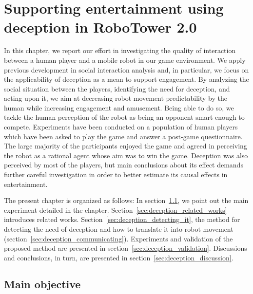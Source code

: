 \chapter{Supporting entertainment using deception in RoboTower 2.0}\label{ch:deception}

In this chapter, we report our effort in investigating the quality of interaction between a human player and a mobile robot in our game environment. %
We apply previous development in social interaction analysis and, in particular, we focus on the applicability of deception as a mean to support engagement. By analyzing the social situation between the players, identifying the need for deception, and acting upon it, we aim at decreasing robot movement predictability by the human while increasing engagement and amusement. Being able to do so, we tackle the human perception of the robot as being an opponent smart enough to compete. Experiments have been conducted on a population of human players which have been asked to play the game and answer a post-game questionnaire. The large majority of the participants enjoyed the game and agreed in perceiving the robot as a rational agent whose aim was to win the game. Deception was also perceived by most of the players, but main conclusions about its effect demands further careful investigation in order to better estimate its causal effects in entertainment.

The present chapter is organized as follows: In section~\ref{sec:deception_main_objectives}, we point out the main experiment detailed in the chapter. Section~\ref{sec:deception_related_works} introduces related works. Section~\ref{sec:deception_detecting_it}, the method for detecting the need of deception and how to translate it into robot movement (section~\ref{sec:deception_communicating}).
Experiments and validation of the proposed method are presented in section~\ref{sec:deception_validation}. Discussions and conclusions, in turn, are presented in section~\ref{sec:deception_discussion}.

\section{Main objective} \label{sec:deception_main_objectives}

